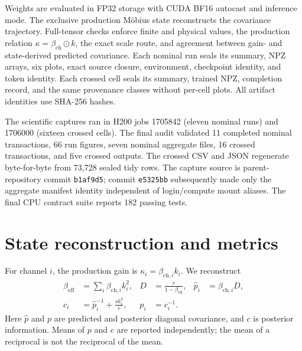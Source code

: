 \documentclass[11pt]{article}
\newcommand{\code}[1]{\texttt{#1}}
\begin{document}
Weights are evaluated in FP32 storage with CUDA BF16 autocast and inference mode.  The
exclusive production M\"obius state reconstructs the covariance trajectory.  Full-tensor
checks enforce finite and physical values, the production relation
$\kappa=\beta_{\mathrm{ch}}\odot k$, the exact scale route, and agreement between gain- and
state-derived predicted covariance.  Each nominal run seals its summary, NPZ arrays, six
plots, exact source closure, environment, checkpoint identity, and token identity.  Each
crossed cell seals its summary, trained NPZ, completion record, and the same provenance
classes without per-cell plots.  All artifact identities use SHA-256 hashes.

The scientific captures ran in H200 jobs 1705842 (eleven nominal runs) and 1706000
(sixteen crossed cells).  The final audit validated 11 completed nominal transactions,
66 run figures, seven nominal aggregate files, 16 crossed transactions, and five crossed
outputs.  The crossed CSV and JSON regenerate byte-for-byte from 73,728 sealed tidy rows.
The capture source is parent-repository commit \code{b1af9d5}; commit \code{e5325bb}
subsequently made only the aggregate manifest identity independent of login/compute mount
aliases.  The final CPU contract suite reports 182 passing tests.

\section{State reconstruction and metrics}

For channel $i$, the production gain is
$\kappa_i=\beta_{\mathrm{ch},i}k_i$.  We reconstruct
\begin{align}
  \beta_{\mathrm{eff}} &= \sum_i \beta_{\mathrm{ch},i}k_i^2,
  &D&=\frac{r}{1-\beta_{\mathrm{eff}}},
  &\widehat p_i&=\beta_{\mathrm{ch},i}D,\\
  c_i&=\widehat p_i^{-1}+\frac{s k_i^2}{r},
  &p_i&=c_i^{-1}.
\end{align}
Here $\widehat p$ and $p$ are predicted and posterior diagonal covariance, and $c$ is
posterior information.  Means of $p$ and $c$ are reported independently; the mean of a
reciprocal is not the reciprocal of the mean.
\end{document}

